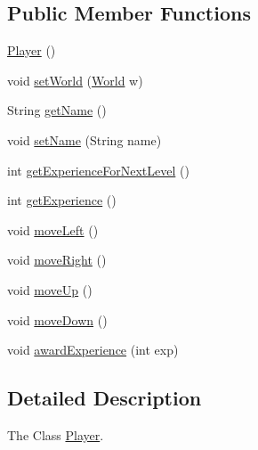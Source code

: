 \subsection*{Public Member Functions}
\begin{DoxyCompactItemize}
\item 
\hyperlink{classjdungeon_1_1core_1_1world_1_1_player_aaf16e0df086804ae4a042e7c435bb6f2}{Player} ()
\item 
void \hyperlink{classjdungeon_1_1core_1_1world_1_1_player_a8928df28dae4b6db028608f6dac561f4}{setWorld} (\hyperlink{classjdungeon_1_1core_1_1world_1_1_world}{World} w)
\item 
String \hyperlink{classjdungeon_1_1core_1_1world_1_1_player_a7f22d0e9498031f27e5e427ad867d3a0}{getName} ()
\item 
void \hyperlink{classjdungeon_1_1core_1_1world_1_1_player_a9e9f35ceb5be596ff7d6c42658b300fd}{setName} (String name)
\item 
int \hyperlink{classjdungeon_1_1core_1_1world_1_1_player_a1ca99ff81b0fac7ef5307b17bc05e50e}{getExperienceForNextLevel} ()
\item 
int \hyperlink{classjdungeon_1_1core_1_1world_1_1_player_a072bec9b1f80e833e1316e8d9490511a}{getExperience} ()
\item 
void \hyperlink{classjdungeon_1_1core_1_1world_1_1_player_ac20f522850d3169018965b955ad18aa3}{moveLeft} ()
\item 
void \hyperlink{classjdungeon_1_1core_1_1world_1_1_player_a44c22f52cb0bfeb2405f28105d27b2df}{moveRight} ()
\item 
void \hyperlink{classjdungeon_1_1core_1_1world_1_1_player_a26a22fece40217ee3710a9fb09e0dafe}{moveUp} ()
\item 
void \hyperlink{classjdungeon_1_1core_1_1world_1_1_player_a0eb969ef50ebd50ec647cf140671d393}{moveDown} ()
\item 
void \hyperlink{classjdungeon_1_1core_1_1world_1_1_player_ae4b31c3cf3ce1e12087737a01e7953c7}{awardExperience} (int exp)
\end{DoxyCompactItemize}


\subsection{Detailed Description}
The Class \hyperlink{classjdungeon_1_1core_1_1world_1_1_player}{Player}. 

